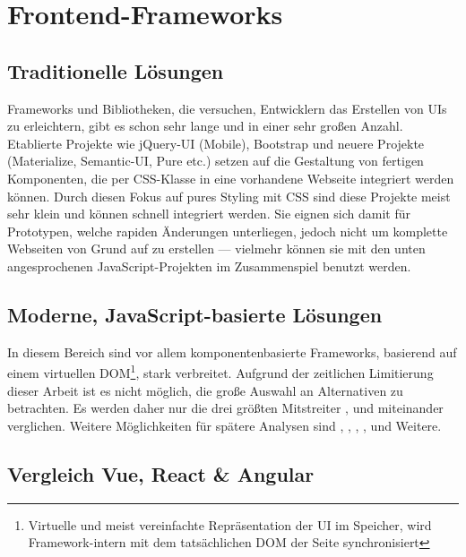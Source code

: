 \section{Frontend-Frameworks}
\subsection{Traditionelle Lösungen}
Frameworks und Bibliotheken, die versuchen, Entwicklern das Erstellen von UIs zu erleichtern, gibt es schon sehr lange und in einer sehr großen Anzahl. Etablierte Projekte wie jQuery-UI (Mobile), Bootstrap und neuere Projekte (Materialize, Semantic-UI, Pure etc.) setzen auf die Gestaltung von fertigen Komponenten, die per CSS-Klasse in eine vorhandene Webseite integriert werden können. Durch diesen Fokus auf pures Styling mit CSS sind diese Projekte meist sehr klein und können schnell integriert werden. Sie eignen sich damit für Prototypen, welche rapiden Änderungen unterliegen, jedoch nicht um komplette Webseiten von Grund auf zu erstellen --- vielmehr können sie mit den unten angesprochenen JavaScript-Projekten im Zusammenspiel benutzt werden.

\subsection{Moderne, JavaScript-basierte Lösungen}
In diesem Bereich sind vor allem komponentenbasierte Frameworks, basierend auf einem virtuellen DOM\footnote{Virtuelle und meist vereinfachte Repräsentation der UI im Speicher, wird Framework-intern mit dem tatsächlichen DOM der Seite synchronisiert}, stark verbreitet. Aufgrund der zeitlichen Limitierung dieser Arbeit ist es nicht möglich, die große Auswahl an Alternativen zu betrachten. Es werden daher nur die drei größten Mitstreiter ,  und  \parencite[vgl.][]{greif_benitte_rambeau_2018} miteinander verglichen. Weitere Möglichkeiten für spätere Analysen sind , , , , und Weitere.

\subsection{Vergleich Vue, React \& Angular}

